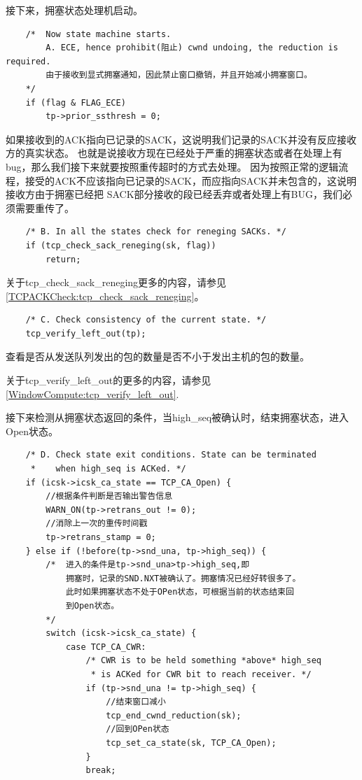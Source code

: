 		接下来，拥塞状态处理机启动。
\begin{verbatim}
	/* 	Now state machine starts.
	 	A. ECE, hence prohibit(阻止) cwnd undoing, the reduction is required. 
		由于接收到显式拥塞通知，因此禁止窗口撤销，并且开始减小拥塞窗口。
	*/
	if (flag & FLAG_ECE)
		tp->prior_ssthresh = 0;
\end{verbatim}

	如果接收到的ACK指向已记录的SACK，这说明我们记录的SACK并没有反应接收方的真实状态。
	也就是说接收方现在已经处于严重的拥塞状态或者在处理上有bug，那么我们接下来就要按照重传超时的方式去处理。
	因为按照正常的逻辑流程，接受的ACK不应该指向已记录的SACK，而应指向SACK并未包含的，这说明接收方由于拥塞已经把
	SACK部分接收的段已经丢弃或者处理上有BUG，我们必须需要重传了。
	
\begin{verbatim}
	/* B. In all the states check for reneging SACKs. */
	if (tcp_check_sack_reneging(sk, flag))
		return;
\end{verbatim}
	
	关于tcp\_check\_sack\_reneging更多的内容，请参见\ref{TCPACKCheck:tcp_check_sack_reneging}。
	
\begin{verbatim}
	/* C. Check consistency of the current state. */
	tcp_verify_left_out(tp);
\end{verbatim}

	查看是否从发送队列发出的包的数量是否不小于发出主机的包的数量。
	
	关于tcp\_verify\_left\_out的更多的内容，请参见\ref{WindowCompute:tcp_verify_left_out}.
	
	接下来检测从拥塞状态返回的条件，当high\_seq被确认时，结束拥塞状态，进入Open状态。
\begin{verbatim}
	/* D. Check state exit conditions. State can be terminated
	 *    when high_seq is ACKed. */
	if (icsk->icsk_ca_state == TCP_CA_Open) {
		//根据条件判断是否输出警告信息		
		WARN_ON(tp->retrans_out != 0);
		//消除上一次的重传时间戳
		tp->retrans_stamp = 0;
	} else if (!before(tp->snd_una, tp->high_seq)) {
		/*	进入的条件是tp->snd_una>tp->high_seq,即
			拥塞时，记录的SND.NXT被确认了。拥塞情况已经好转很多了。
			此时如果拥塞状态不处于OPen状态，可根据当前的状态结束回
			到Open状态。
		*/
		switch (icsk->icsk_ca_state) {
			case TCP_CA_CWR:
				/* CWR is to be held something *above* high_seq
				 * is ACKed for CWR bit to reach receiver. */
				if (tp->snd_una != tp->high_seq) {
					//结束窗口减小					
					tcp_end_cwnd_reduction(sk);
					//回到OPen状态		
					tcp_set_ca_state(sk, TCP_CA_Open);
				}
				break;
\end{verbatim}

